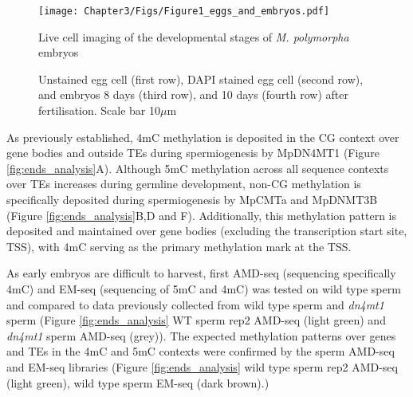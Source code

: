\begin{figure}[htbp!] 
\centering    
    \texttt{[image: Chapter3/Figs/Figure1\_eggs\_and\_embryos.pdf]}
\caption{Live cell imaging of the developmental stages of \textit{M. polymorpha} embryos}
\label{fig:egg_embryo}
\captionsetup{font=small}
    \caption*{Unstained egg cell (first row), DAPI stained egg cell (second row), and embryos 8 days (third row), and 10 days (fourth row) after fertilisation. Scale bar 10$\mu$m}
\end{figure}

As previously established, 4mC methylation is deposited in the CG context over gene bodies and outside TEs during spermiogenesis by MpDN4MT1 (Figure \ref{fig:ends_analysis}A)\cite{RN189}. Although 5mC methylation across all sequence contexts over TEs increases during germline development, non-CG methylation is specifically deposited during spermiogenesis by MpCMTa and MpDNMT3B (Figure \ref{fig:ends_analysis}B,D and F)\cite{RN189}. Additionally, this methylation pattern is deposited and maintained over gene bodies (excluding the transcription start site, TSS), with 4mC serving as the primary methylation mark at the TSS. 

As early embryos are difficult to harvest, first AMD-seq (sequencing specifically 4mC) and EM-seq (sequencing of 5mC and 4mC) was tested on wild type sperm and compared to data previously collected from wild type sperm and \textit{dn4mt1} sperm (Figure \ref{fig:ends_analysis} WT sperm rep2 AMD-seq (light green) and \textit{dn4mt1} sperm AMD-seq (grey)). The expected methylation patterns over genes and TEs in the 4mC and 5mC contexts were confirmed by the sperm AMD-seq and EM-seq libraries (Figure \ref{fig:ends_analysis} wild type sperm rep2 AMD-seq (light green), wild type sperm EM-seq (dark brown).) 

